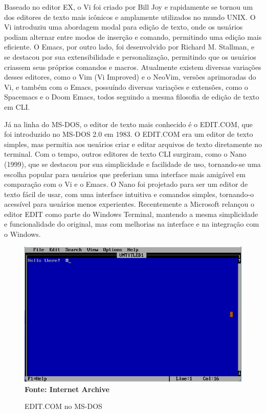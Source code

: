 Baseado no editor EX, o Vi foi criado por Bill Joy e rapidamente se tornou um dos editores de texto mais icônicos e amplamente utilizados no mundo UNIX.
O Vi introduziu uma abordagem modal para edição de texto, onde os usuários podiam alternar entre modos de inserção e comando, permitindo uma edição mais
eficiente. O Emacs, por outro lado, foi desenvolvido por Richard M. Stallman, e se destacou por sua extensibilidade e personalização, permitindo que os
usuários criassem seus próprios comandos e macros. Atualmente existem diversas variações desses editores, como o Vim (Vi Improved) e o NeoVim, versões
aprimoradas do Vi, e também com o Emacs, possuíndo diversas variações e extensões, como o Spacemacs e o Doom Emacs, todos seguindo a mesma filosofia de edição
de texto em CLI.

Já na linha do MS-DOS, o editor de texto mais conhecido é o EDIT.COM, que foi introduzido no MS-DOS 2.0 em 1983. O EDIT.COM era um editor de
texto simples, mas permitia aos usuários criar e editar arquivos de texto diretamente no terminal. Com o tempo, outros editores de texto CLI surgiram, como o
Nano (1999), que se destacou por sua simplicidade e facilidade de uso, tornando-se uma escolha popular para usuários que preferiam uma interface mais amigável
em comparação com o Vi e o Emacs. O Nano foi projetado para ser um editor de texto fácil de usar, com uma interface intuitiva e comandos simples, tornando-o
acessível para usuários menos experientes. Recentemente a Microsoft relançou o editor EDIT como parte do Windows Terminal, mantendo a mesma
simplicidade e funcionalidade do original, mas com melhorias na interface e na integração com o Windows.

\FloatBarrier
\begin{figure}[!htbp]
	\centering
	\caption{EDIT.COM no MS-DOS}
	\includegraphics[scale=0.8]{imagens/EDIT_MSDOS}
	\\\textbf{Fonte: Internet Archive}
	\label{fig:EDIT_MSDOS}
\end{figure}
\FloatBarrier

